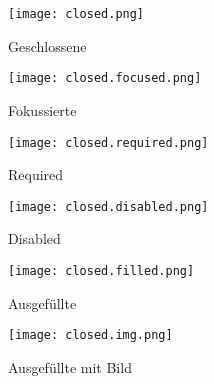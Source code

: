 
\begin{figure}[!htb]
    \centering
    \begin{minipage}[b]{0.45\textwidth}
        \centering
        \texttt{[image: closed.png]}
        \caption{Geschlossene }
        \label{img:closedNewComp}
    \end{minipage}
    \hfill
    \begin{minipage}[b]{0.45\textwidth}
        \centering
        \texttt{[image: closed.focused.png]}
        \caption{Fokussierte }
        \label{img:closedFocusedNewComp}
    \end{minipage}
\end{figure}

\begin{figure}[!htb]
    \centering
    \begin{minipage}[b]{0.45\textwidth}
        \centering
        \texttt{[image: closed.required.png]}
        \caption{Required }
        \label{img:closedRequiredNewComp}
    \end{minipage}
    \hfill
    \begin{minipage}[b]{0.45\textwidth}
        \centering
        \texttt{[image: closed.disabled.png]}
        \caption{Disabled }
        \label{img:closedDisabledNewComp}
    \end{minipage}
\end{figure}

\begin{figure}[!htb]
    \centering
    \begin{minipage}[b]{0.45\textwidth}
        \centering
        \texttt{[image: closed.filled.png]}
        \caption{Ausgefüllte }
        \label{img:closedFilledNewComp}
    \end{minipage}
    \hfill
    \begin{minipage}[b]{0.45\textwidth}
        \centering
        \texttt{[image: closed.img.png]}
        \caption{Ausgefüllte  mit Bild}
        \label{img:closedImgNewComp}
    \end{minipage}
\end{figure}


